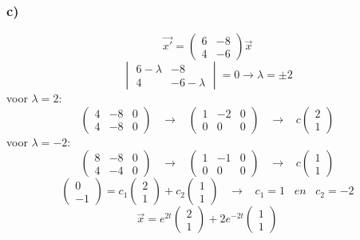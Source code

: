 \documentclass[11pt]{article}
\begin{document}
\subsubsection*{c)}
\[
\vec{x'}
= 
\begin{pmatrix}
6 & -8\\
4 & -6
\end{pmatrix}
\vec{x}
\]
\[
\begin{vmatrix}
6-\lambda & -8\\
4 & -6-\lambda
\end{vmatrix}
=0
\longrightarrow
\lambda= \pm 2
\]
voor $\lambda=2$:
\[
\left(
\begin{array}{cc|c}
4 & -8 & 0 \\
4 & -8 & 0
\end{array}
\right)
\;\;\;\longrightarrow\;\;\;
\left(
\begin{array}{cc|c}
1 & -2 & 0 \\
0 & 0 & 0
\end{array}
\right)
\;\;\;\longrightarrow\;\;\;
c
\begin{pmatrix}
2\\1
\end{pmatrix}
\]
voor $\lambda=-2$:
\[
\left(
\begin{array}{cc|c}
8 & -8 & 0 \\
4 & -4 & 0
\end{array}
\right)
\;\;\;\longrightarrow\;\;\;
\left(
\begin{array}{cc|c}
1 & -1 & 0 \\
0 & 0 & 0
\end{array}
\right)
\;\;\;\longrightarrow\;\;\;
c
\begin{pmatrix}
1\\1
\end{pmatrix}
\]
\[
\begin{pmatrix}
0\\-1
\end{pmatrix}
=
c_1
\begin{pmatrix}
2\\1
\end{pmatrix}
+
c_2
\begin{pmatrix}
1\\1
\end{pmatrix}
\;\;\;\longrightarrow\;\;\;
c_1 = 1
\;\;\;en\;\;\;
c_2 = -2
\]
\[
\vec{x}=
e^{2t}
\begin{pmatrix}
2\\1
\end{pmatrix}
+
2e^{-2t}
\begin{pmatrix}
1\\1
\end{pmatrix}
\]
\end{document}
